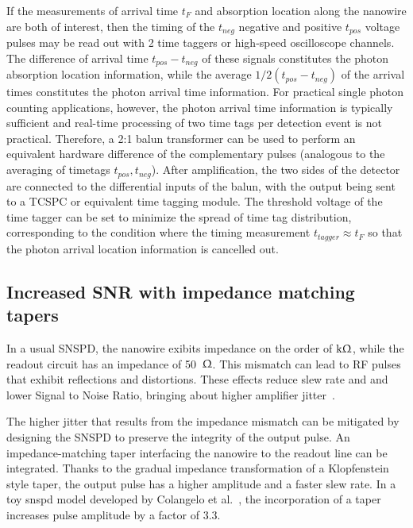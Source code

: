 \documentclass[11pt]{caltech_thesis} %
\begin{document}
If the measurements of arrival time $t_F$ and absorption location along the nanowire are both of interest, then the timing of the $t_{neg}$ negative and positive $t_{pos}$ voltage pulses may be read out with 2 time taggers or high-speed oscilloscope channels. The difference of arrival time $t_{pos} - t_{neg}$ of these signals constitutes the photon absorption location information, while the average $1/2(t_{pos} - t_{neg})$ of the arrival times constitutes the photon arrival time information. For practical single photon counting applications, however, the photon arrival time information is typically sufficient and real-time processing of two time tags per detection event is not practical. Therefore, a 2:1 balun transformer can be used to perform an equivalent hardware difference of the complementary pulses (analogous to the averaging of timetags $t_{pos}, t_{neg}$). After amplification, the two sides of the detector are connected to the differential inputs of the balun, with the output being sent to a TCSPC or equivalent time tagging module. The threshold voltage of the time tagger can be set to minimize the spread of time tag distribution, corresponding to the condition where the timing measurement $t_{tagger} \approx t_F$ so that the photon arrival location information is cancelled out.

\hypertarget{increased-snr-with-impedance-matching-tapers}{%
\subsection{Increased SNR with impedance matching tapers}\label{increased-snr-with-impedance-matching-tapers}}

In a usual SNSPD, the nanowire exibits impedance on the order of $\mathrm{k} \Upomega$, while the readout circuit has an impedance of 50~$\Upomega$. This mismatch can lead to RF pulses that exhibit reflections and distortions. These effects reduce slew rate and and lower Signal to Noise Ratio, bringing about higher amplifier jitter~\autocite{Korzh2020,santavicca2019jitter}.

The higher jitter that results from the impedance mismatch can be mitigated by designing the SNSPD to preserve the integrity of the output pulse. An impedance-matching taper interfacing the nanowire to the readout line can be integrated. Thanks to the gradual impedance transformation of a Klopfenstein style taper, the output pulse has a higher amplitude and a faster slew rate. In a toy snspd model developed by Colangelo et al.~\autocite{Colangelo2023}, the incorporation of a taper increases pulse amplitude by a factor of 3.3.
\end{document}
